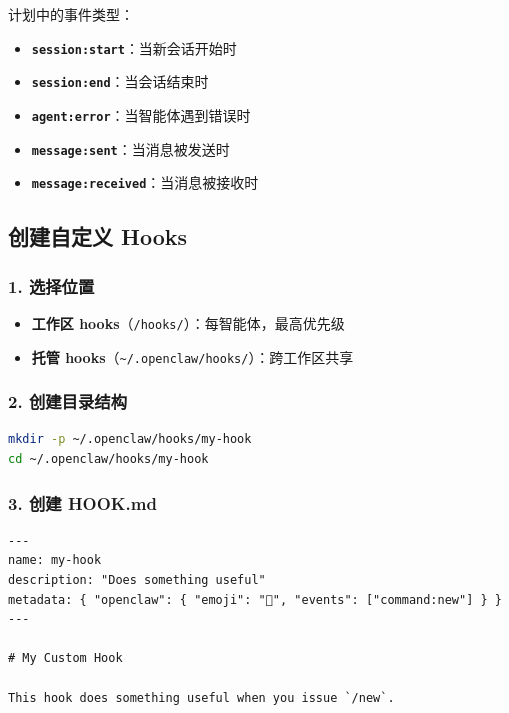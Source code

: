 计划中的事件类型：

\begin{itemize}
  \item \textbf{\texttt{session:start}}：当新会话开始时
  \item \textbf{\texttt{session:end}}：当会话结束时
  \item \textbf{\texttt{agent:error}}：当智能体遇到错误时
  \item \textbf{\texttt{message:sent}}：当消息被发送时
  \item \textbf{\texttt{message:received}}：当消息被接收时
\end{itemize}


\subsection{创建自定义 Hooks}


\subsubsection{1. 选择位置}


\begin{itemize}
  \item \textbf{工作区 hooks}（\texttt{/hooks/}）：每智能体，最高优先级
  \item \textbf{托管 hooks}（\texttt{\textasciitilde{}/.openclaw/hooks/}）：跨工作区共享
\end{itemize}


\subsubsection{2. 创建目录结构}


\begin{lstlisting}[language=bash]
mkdir -p ~/.openclaw/hooks/my-hook
cd ~/.openclaw/hooks/my-hook
\end{lstlisting}


\subsubsection{3. 创建 HOOK.md}


\begin{lstlisting}
---
name: my-hook
description: "Does something useful"
metadata: { "openclaw": { "emoji": "🎯", "events": ["command:new"] } }
---

# My Custom Hook

This hook does something useful when you issue `/new`.
\end{lstlisting}



